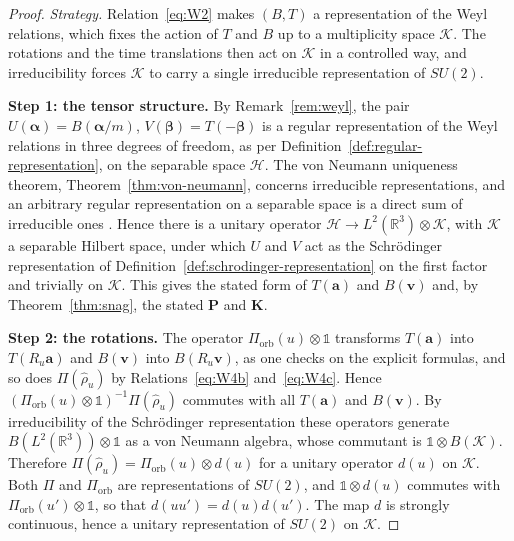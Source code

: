 \begin{proof}
	\emph{Strategy.} Relation~\eqref{eq:W2} makes $(B,T)$ a representation of the Weyl relations, which fixes the action of $T$ and $B$ up to a multiplicity space $\mathcal{K}$. The rotations and the time translations then act on $\mathcal{K}$ in a controlled way, and irreducibility forces $\mathcal{K}$ to carry a single irreducible representation of $SU(2)$.
	
	\medskip
	\noindent\textbf{Step 1: the tensor structure.} By Remark~\ref{rem:weyl}, the pair $U(\boldsymbol{\alpha})=B(\boldsymbol{\alpha}/m)$, $V(\boldsymbol{\beta})=T(-\boldsymbol{\beta})$ is a regular representation of the Weyl relations in three degrees of freedom, as per Definition~\ref{def:regular-representation}, on the separable space $\mathcal{H}$. The von Neumann uniqueness theorem, Theorem~\ref{thm:von-neumann}, concerns irreducible representations, and an arbitrary regular representation on a separable space is a direct sum of irreducible ones \cite[TODO-location]{TODO-RS03}. Hence there is a unitary operator $\mathcal{H}\to L^2(\mathbb{R}^3)\otimes\mathcal{K}$, with $\mathcal{K}$ a separable Hilbert space, under which $U$ and $V$ act as the Schrödinger representation of Definition~\ref{def:schrodinger-representation} on the first factor and trivially on $\mathcal{K}$. This gives the stated form of $T(\mathbf{a})$ and $B(\mathbf{v})$ and, by Theorem~\ref{thm:snag}, the stated $\mathbf{P}$ and $\mathbf{K}$.
	
	\medskip
	\noindent\textbf{Step 2: the rotations.} The operator $\Pi_{\mathrm{orb}}(u)\otimes\mathbb{1}$ transforms $T(\mathbf{a})$ into $T(R_u\mathbf{a})$ and $B(\mathbf{v})$ into $B(R_u\mathbf{v})$, as one checks on the explicit formulas, and so does $\Pi(\hat\rho_u)$ by Relations~\eqref{eq:W4b} and~\eqref{eq:W4c}. Hence $(\Pi_{\mathrm{orb}}(u)\otimes\mathbb{1})^{-1}\Pi(\hat\rho_u)$ commutes with all $T(\mathbf{a})$ and $B(\mathbf{v})$. By irreducibility of the Schrödinger representation these operators generate $B(L^2(\mathbb{R}^3))\otimes\mathbb{1}$ as a von Neumann algebra, whose commutant is $\mathbb{1}\otimes B(\mathcal{K})$. Therefore $\Pi(\hat\rho_u)=\Pi_{\mathrm{orb}}(u)\otimes d(u)$ for a unitary operator $d(u)$ on $\mathcal{K}$. Both $\Pi$ and $\Pi_{\mathrm{orb}}$ are representations of $SU(2)$, and $\mathbb{1}\otimes d(u)$ commutes with $\Pi_{\mathrm{orb}}(u')\otimes\mathbb{1}$, so that $d(uu')=d(u)d(u')$. The map $d$ is strongly continuous, hence a unitary representation of $SU(2)$ on $\mathcal{K}$.
	

\end{proof}
